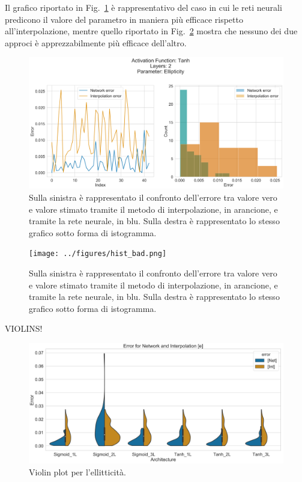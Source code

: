 \documentclass[12pt,a4paper,final]{book}
\begin{document}
Il grafico riportato in Fig.~\ref{hist_good} è rappresentativo del caso in cui le reti neurali predicono il valore del parametro in maniera più efficace rispetto all'interpolazione, mentre quello riportato in Fig.~\ref{hist_bad} mostra che nessuno dei due approci è apprezzabilmente più efficace dell'altro.

\begin{figure}[!ht]
	\centering
	\includegraphics[width=\linewidth]{../figures/hist_good.png}
	\caption{Sulla sinistra è rappresentato il confronto dell'errore tra valore vero e valore stimato tramite il metodo di interpolazione, in arancione, e tramite la rete neurale, in blu. Sulla destra è rappresentato lo stesso grafico sotto forma di istogramma.}
	\label{hist_good}
\end{figure}

\begin{figure}[!ht]
	\centering
	\texttt{[image: ../figures/hist\_bad.png]}
	\caption{Sulla sinistra è rappresentato il confronto dell'errore tra valore vero e valore stimato tramite il metodo di interpolazione, in arancione, e tramite la rete neurale, in blu. Sulla destra è rappresentato lo stesso grafico sotto forma di istogramma.}
	\label{hist_bad}
\end{figure}


VIOLINS!

\begin{figure}[!ht]
    \centering
    \includegraphics[width=0.8\linewidth]{../figures/violin_plot_e.png}
    \caption{Violin plot per l'ellitticità.}
    \label{violin_e}
\end{figure}
\end{document}

